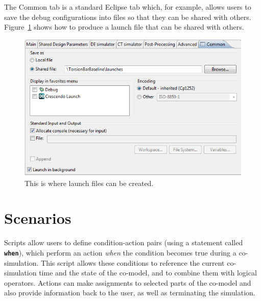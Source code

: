 \documentclass{crescendorepchap}
\begin{document}
The Common tab is a standard Eclipse tab which, for example, allows
users to save the debug configurations into files so that they can be
shared with others. Figure~\ref{fig:commontab} shows how to produce a launch file that can be shared with others.

\begin{figure}[htbp]
\centering
\includegraphics[width=.6\textwidth]{images/Commontab.png}
\caption{This is where launch files can be created.\label{fig:commontab}}
\end{figure}

\section{Scenarios}\label{sec:scenarios}



Scripts allow users
  to define condition-action pairs (using a statement called
  \texttt{\textbf{when}}), which perform an action \emph{when} the condition becomes true during
  a co-simulation. This script allows these conditions to reference the
  current co-simulation time and the state of the co-model, and to
  combine them with logical operators. Actions can make assignments to selected
  parts of the co-model and also provide information back to the user,
  as well as terminating the simulation.
\end{document}
